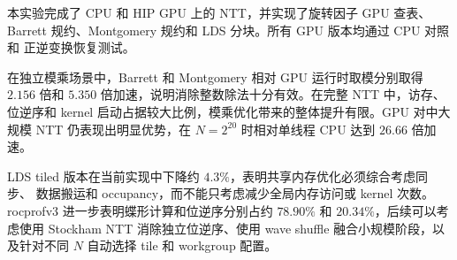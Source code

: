 ﻿\documentclass[a4paper]{article}
\begin{document}
本实验完成了 CPU 和 HIP GPU 上的 NTT，并实现了旋转因子 GPU 查表、
Barrett 规约、Montgomery 规约和 LDS 分块。所有 GPU 版本均通过 CPU 对照和
正逆变换恢复测试。

在独立模乘场景中，Barrett 和 Montgomery 相对 GPU 运行时取模分别取得
$2.156$ 倍和 $5.350$ 倍加速，说明消除整数除法十分有效。在完整 NTT 中，访存、
位逆序和 kernel 启动占据较大比例，模乘优化带来的整体提升有限。GPU 对中大规模
NTT 仍表现出明显优势，在 $N=2^{20}$ 时相对单线程 CPU 达到 $26.66$ 倍加速。

LDS tiled 版本在当前实现中下降约 $4.3\%$，表明共享内存优化必须综合考虑同步、
数据搬运和 occupancy，而不能只考虑减少全局内存访问或 kernel 次数。rocprofv3
进一步表明蝶形计算和位逆序分别占约 $78.90\%$ 和 $20.34\%$，后续可以考虑使用
Stockham NTT 消除独立位逆序、使用 wave shuffle 融合小规模阶段，以及针对不同
$N$ 自动选择 tile 和 workgroup 配置。
\end{document}
